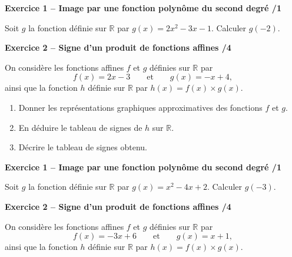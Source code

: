 \documentclass[10pt,a4paper]{article}
\begin{document}

\begin{sujets}


\textbf{Exercice 1 -- Image par une fonction polynôme du second degré \hfill /1}

Soit \(g\) la fonction définie sur \(\mathbb{R}\) par \(g(x)=2x^2-3x-1\). Calculer \(g(-2)\).

\vspace{2cm}

\textbf{Exercice 2 -- Signe d'un produit de fonctions affines \hfill /4}

On considère les fonctions affines \(f\) et \(g\) définies sur \(\mathbb{R}\) par
\[
f(x)=2x-3 \qquad\text{et}\qquad g(x)=-x+4,
\]
ainsi que la fonction \(h\) définie sur \(\mathbb{R}\) par \(h(x)=f(x)\times g(x)\).

\begin{enumerate}
\item Donner les représentations graphiques approximatives des fonctions \(f\) et \(g\).

\vspace{2cm}

\item En déduire le tableau de signes de \(h\) sur \(\mathbb{R}\).

\vspace{4cm}

\item Décrire le tableau de signes obtenu.
\end{enumerate}

\columnbreak


\textbf{Exercice 1 -- Image par une fonction polynôme du second degré \hfill /1}

Soit \(g\) la fonction définie sur \(\mathbb{R}\) par \(g(x)=x^2-4x+2\). Calculer \(g(-3)\).

\vspace{2cm}

\textbf{Exercice 2 -- Signe d'un produit de fonctions affines \hfill /4}

On considère les fonctions affines \(f\) et \(g\) définies sur \(\mathbb{R}\) par
\[
f(x)=-3x+6 \qquad\text{et}\qquad g(x)=x+1,
\]
ainsi que la fonction \(h\) définie sur \(\mathbb{R}\) par \(h(x)=f(x)\times g(x)\).


\end{sujets}
\end{document}
